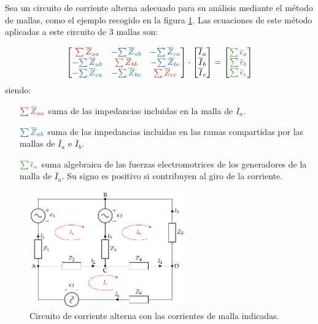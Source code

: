 Sea un circuito de corriente alterna adecuado para su análisis
mediante el método de mallas, como el ejemplo recogido en la figura
\ref{fig:mallas-alterna}. Las ecuaciones de este método aplicadas a
este circuito de 3 mallas son:

\begin{equation*}
  \begin{bmatrix}
    {\color{BrickRed}\sum \overline{Z}_{aa}} &  - {\color{MidnightBlue}\sum \overline{Z}_{ab}} & - {\color{MidnightBlue}\sum \overline{Z}_{ca}} \\
    - {\color{MidnightBlue}\sum \overline{Z}_{ab}} & {\color{BrickRed}\sum \overline{Z}_{bb}} & - {\color{MidnightBlue}\sum \overline{Z}_{bc}} \\
    - {\color{MidnightBlue}\sum \overline{Z}_{ca}} & - {\color{MidnightBlue}\sum \overline{Z}_{bc}} &  {\color{BrickRed}\sum \overline{Z}_{cc}}
  \end{bmatrix} \cdot %
  \begin{bmatrix}
    \overline{I}_a\\
    \overline{I}_b\\
    \overline{I}_c\\
  \end{bmatrix} = %
  \begin{bmatrix}
    {\color{OliveGreen}\sum\overline{\epsilon}_a}\\
    {\color{OliveGreen}\sum\overline{\epsilon}_b}\\
    {\color{OliveGreen}\sum\overline{\epsilon}_c}
  \end{bmatrix}
\end{equation*}
siendo:
\begin{itemize}
\item[{\({\color{BrickRed}\sum \overline{Z}_{aa}}\)}] suma de las impedancias incluidas en la malla de \(\overline{I}_a\).
\item[{\({\color{MidnightBlue}\sum \overline{Z}_{ab}}\)}] suma de las impedancias incluidas en las ramas compartidas por las mallas de \(\overline{I}_a\) e \(\overline{I}_b\).
\item[{\({\color{OliveGreen}\sum \overline{\epsilon}_a}\)}] suma algebraica de las fuerzas electromotrices de los generadores de la malla de \(\overline{I}_a\). Su signo es positivo si contribuyen al giro de la corriente.
\end{itemize}

\begin{figure}[H]
  \centering
  \includegraphics[height=5cm]{../figs/mallas_alterna.pdf}
  \caption{Circuito de corriente alterna con las corrientes de malla indicadas.}
  \label{fig:mallas-alterna}
\end{figure}

